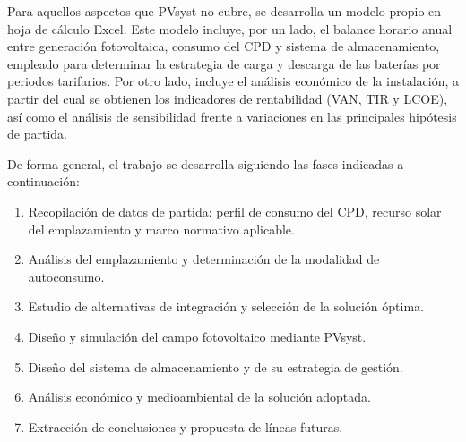 Para aquellos aspectos que PVsyst no cubre, se desarrolla un modelo propio en hoja de cálculo Excel. Este modelo incluye, por un lado, el balance horario anual entre generación fotovoltaica, consumo del \ac{CPD} y sistema de almacenamiento, empleado para determinar la estrategia de carga y descarga de las baterías por periodos tarifarios. Por otro lado, incluye el análisis económico de la instalación, a partir del cual se obtienen los indicadores de rentabilidad (\ac{VAN}, \ac{TIR} y \ac{LCOE}), así como el análisis de sensibilidad frente a variaciones en las principales hipótesis de partida.

De forma general, el trabajo se desarrolla siguiendo las fases indicadas a continuación:

\begin{enumerate}
    \item Recopilación de datos de partida: perfil de consumo del \ac{CPD}, recurso solar del emplazamiento y marco normativo aplicable.
    \item Análisis del emplazamiento y determinación de la modalidad de autoconsumo.
    \item Estudio de alternativas de integración y selección de la solución óptima.
    \item Diseño y simulación del campo fotovoltaico mediante PVsyst.
    \item Diseño del sistema de almacenamiento y de su estrategia de gestión.
    \item Análisis económico y medioambiental de la solución adoptada.
    \item Extracción de conclusiones y propuesta de líneas futuras.
\end{enumerate}
